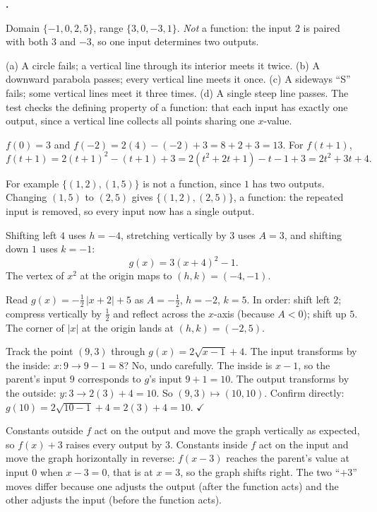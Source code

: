\documentclass[12pt]{book}
\let\originalcheckmark\checkmark
\renewcommand{\checkmark}{\ensuremath{\originalcheckmark}}
\newcounter{soln}[section]
\newenvironment{solutions}{%
  \setcounter{soln}{0}%
  \begin{list}{\textbf{\arabic{soln}.}}{%
    \usecounter{soln}\setlength{\leftmargin}{2.2em}\setlength{\itemsep}{10pt}}%
}{\end{list}}
\begin{document}
\begin{solutions}
\item Domain $\{-1,0,2,5\}$, range $\{3,0,-3,1\}$. \emph{Not} a function: the input
$2$ is paired with both $3$ and $-3$, so one input determines two outputs.

\item (a) A circle fails; a vertical line through its interior meets it twice.
(b) A downward parabola passes; every vertical line meets it once.
(c) A sideways ``S'' fails; some vertical lines meet it three times.
(d) A single steep line passes. The test checks the defining property of a function:
that each input has exactly one output, since a vertical line collects all points
sharing one $x$-value.

\item $f(0)=3$ and $f(-2)=2(4)-(-2)+3=8+2+3=13$. For $f(t+1)$,
\[
f(t+1)=2(t+1)^2-(t+1)+3=2(t^2+2t+1)-t-1+3=2t^2+3t+4.
\]

\item For example $\{(1,2),(1,5)\}$ is not a function, since $1$ has two outputs.
Changing $(1,5)$ to $(2,5)$ gives $\{(1,2),(2,5)\}$, a function: the repeated input is
removed, so every input now has a single output.

\item Shifting left $4$ uses $h=-4$, stretching vertically by $3$ uses $A=3$, and
shifting down $1$ uses $k=-1$:
\[
g(x)=3(x+4)^2-1.
\]
The vertex of $x^2$ at the origin maps to $(h,k)=(-4,-1)$.

\item Read $g(x)=-\tfrac12\,|x+2|+5$ as $A=-\tfrac12$, $h=-2$, $k=5$. In order:
shift left $2$; compress vertically by $\tfrac12$ and reflect across the $x$-axis
(because $A<0$); shift up $5$. The corner of $|x|$ at the origin lands at
$(h,k)=(-2,5)$.

\item Track the point $(9,3)$ through $g(x)=2\sqrt{x-1}+4$. The input transforms by
the inside: $x:9\to 9-1=8$? No, undo carefully. The inside is $x-1$, so the parent's
input $9$ corresponds to $g$'s input $9+1=10$. The output transforms by the outside:
$y:3\to 2(3)+4=10$. So $(9,3)\mapsto(10,10)$. Confirm directly:
$g(10)=2\sqrt{10-1}+4=2(3)+4=10$. \checkmark

\item Constants outside $f$ act on the output and move the graph vertically as
expected, so $f(x)+3$ raises every output by $3$. Constants inside $f$ act on the
input and move the graph horizontally in reverse: $f(x-3)$ reaches the parent's value
at input $0$ when $x-3=0$, that is at $x=3$, so the graph shifts right. The two
``$+3$'' moves differ because one adjusts the output (after the function acts) and the
other adjusts the input (before the function acts).


\end{solutions}
\end{document}

